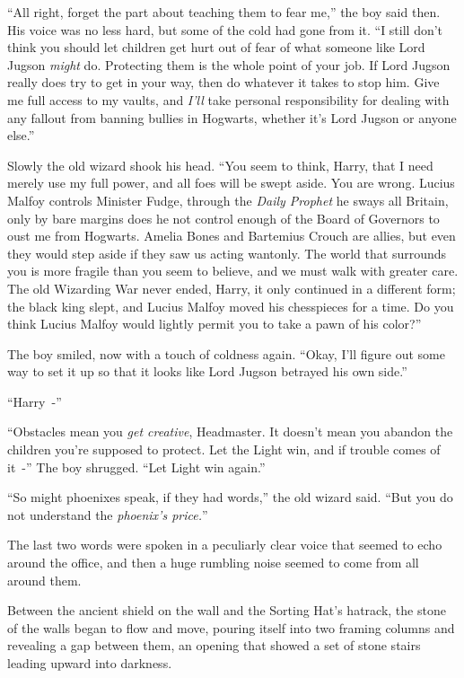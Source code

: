 ``All right, forget the part about teaching them to fear me,'' the boy said then. His voice was no less hard, but some of the cold had gone from it. ``I still don't think you should let children get hurt out of fear of what someone like Lord Jugson \emph{might} do. Protecting them is the whole point of your job. If Lord Jugson really does try to get in your way, then do whatever it takes to stop him. Give me full access to my vaults, and \emph{I'll} take personal responsibility for dealing with any fallout from banning bullies in Hogwarts, whether it's Lord Jugson or anyone else.''

Slowly the old wizard shook his head. ``You seem to think, Harry, that I need merely use my full power, and all foes will be swept aside. You are wrong. Lucius Malfoy controls Minister Fudge, through the \emph{Daily Prophet} he sways all Britain, only by bare margins does he not control enough of the Board of Governors to oust me from Hogwarts. Amelia Bones and Bartemius Crouch are allies, but even they would step aside if they saw us acting wantonly. The world that surrounds you is more fragile than you seem to believe, and we must walk with greater care. The old Wizarding War never ended, Harry, it only continued in a different form; the black king slept, and Lucius Malfoy moved his chesspieces for a time. Do you think Lucius Malfoy would lightly permit you to take a pawn of his color?''

The boy smiled, now with a touch of coldness again. ``Okay, I'll figure out some way to set it up so that it looks like Lord Jugson betrayed his own side.''

``Harry~-''

``Obstacles mean you \emph{get creative}, Headmaster. It doesn't mean you abandon the children you're supposed to protect. Let the Light win, and if trouble comes of it~-'' The boy shrugged. ``Let Light win again.''

``So might phoenixes speak, if they had words,'' the old wizard said. ``But you do not understand the \emph{phoenix's price.}''

The last two words were spoken in a peculiarly clear voice that seemed to echo around the office, and then a huge rumbling noise seemed to come from all around them.

Between the ancient shield on the wall and the Sorting Hat's hatrack, the stone of the walls began to flow and move, pouring itself into two framing columns and revealing a gap between them, an opening that showed a set of stone stairs leading upward into darkness.


